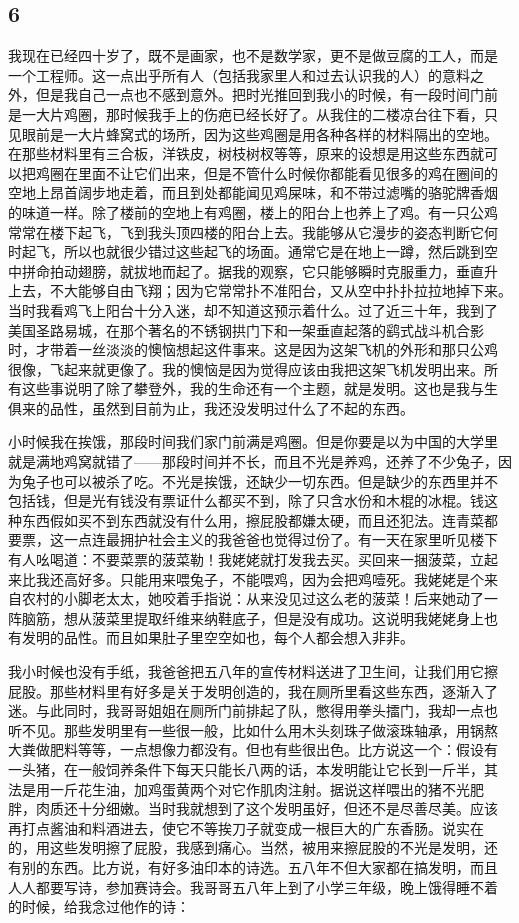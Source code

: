 \subsection{6}

我现在已经四十岁了，既不是画家，也不是数学家，更不是做豆腐的工人，而是
一个工程师。这一点出乎所有人（包括我家里人和过去认识我的人）的意料之
外，但是我自己一点也不感到意外。把时光推回到我小的时候，有一段时间门前
是一大片鸡圈，那时候我手上的伤疤已经长好了。从我住的二楼凉台往下看，只
见眼前是一大片蜂窝式的场所，因为这些鸡圈是用各种各样的材料隔出的空地。
在那些材料里有三合板，洋铁皮，树枝树杈等等，原来的设想是用这些东西就可
以把鸡圈在里面不让它们出来，但是不管什么时候你都能看见很多的鸡在圈间的
空地上昂首阔步地走着，而且到处都能闻见鸡屎味，和不带过滤嘴的骆驼牌香烟
的味道一样。除了楼前的空地上有鸡圈，楼上的阳台上也养上了鸡。有一只公鸡
常常在楼下起飞，飞到我头顶四楼的阳台上去。我能够从它漫步的姿态判断它何
时起飞，所以也就很少错过这些起飞的场面。通常它是在地上一蹲，然后跳到空
中拼命拍动翅膀，就拔地而起了。据我的观察，它只能够瞬时克服重力，垂直升
上去，不大能够自由飞翔；因为它常常扑不准阳台，又从空中扑扑拉拉地掉下来。
当时我看鸡飞上阳台十分入迷，却不知道这预示着什么。过了近三十年，我到了
美国圣路易城，在那个著名的不锈钢拱门下和一架垂直起落的鹞式战斗机合影
时，才带着一丝淡淡的懊恼想起这件事来。这是因为这架飞机的外形和那只公鸡
很像，飞起来就更像了。我的懊恼是因为觉得应该由我把这架飞机发明出来。所
有这些事说明了除了攀登外，我的生命还有一个主题，就是发明。这也是我与生
俱来的品性，虽然到目前为止，我还没发明过什么了不起的东西。

小时候我在挨饿，那段时间我们家门前满是鸡圈。但是你要是以为中国的大学里
就是满地鸡窝就错了——那段时间并不长，而且不光是养鸡，还养了不少兔子，因
为兔子也可以被杀了吃。不光是挨饿，还缺少一切东西。但是缺少的东西里并不
包括钱，但是光有钱没有票证什么都买不到，除了只含水份和木棍的冰棍。钱这
种东西假如买不到东西就没有什么用，擦屁股都嫌太硬，而且还犯法。连青菜都
要票，这一点连最拥护社会主义的我爸爸也觉得过份了。有一天在家里听见楼下
有人吆喝道：不要菜票的菠菜勒！我姥姥就打发我去买。买回来一捆菠菜，立起
来比我还高好多。只能用来喂兔子，不能喂鸡，因为会把鸡噎死。我姥姥是个来
自农村的小脚老太太，她咬着手指说：从来没见过这么老的菠菜！后来她动了一
阵脑筋，想从菠菜里提取纤维来纳鞋底子，但是没有成功。这说明我姥姥身上也
有发明的品性。而且如果肚子里空空如也，每个人都会想入非非。

我小时候也没有手纸，我爸爸把五八年的宣传材料送进了卫生间，让我们用它擦
屁股。那些材料里有好多是关于发明创造的，我在厕所里看这些东西，逐渐入了
迷。与此同时，我哥哥姐姐在厕所门前排起了队，憋得用拳头擂门，我却一点也
听不见。那些发明里有一些很一般，比如什么用木头刻珠子做滚珠轴承，用锅熬
大粪做肥料等等，一点想像力都没有。但也有些很出色。比方说这一个：假设有
一头猪，在一般饲养条件下每天只能长八两的话，本发明能让它长到一斤半，其
法是用一斤花生油，加鸡蛋黄两个对它作肌肉注射。据说这样喂出的猪不光肥
胖，肉质还十分细嫩。当时我就想到了这个发明虽好，但还不是尽善尽美。应该
再打点酱油和料酒进去，使它不等挨刀子就变成一根巨大的广东香肠。说实在
的，用这些发明擦了屁股，我感到痛心。当然，被用来擦屁股的不光是发明，还
有别的东西。比方说，有好多油印本的诗选。五八年不但大家都在搞发明，而且
人人都要写诗，参加赛诗会。我哥哥五八年上到了小学三年级，晚上饿得睡不着
的时候，给我念过他作的诗：

